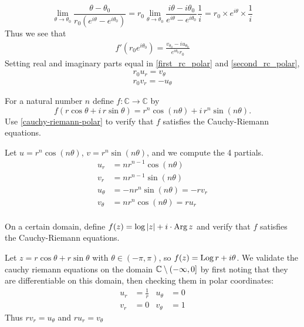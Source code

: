 \documentclass{homework}
\begin{document}
\begin{solution}
     \[\lim_{\theta \to \theta_0} \frac{\theta - \theta_0}{r_0(e^{i\theta} - e^{i\theta_0})} = r_0\lim_{\theta \to \theta_0} \frac{i\theta - i\theta_0}{e^{i\theta} - e^{i\theta_0}}\frac{1}{i} = r_0\times e^{i\theta}\times\frac{1}{i}
     \]
     Thus we see that
     \begin{align}\label{second_rc_polar}
     f'(r_0e^{i\theta_0}) = \frac{v_{\theta_0} - iu_{\theta_0}}{e^{i\theta_0}r_0}
     \end{align}
     Setting real and imaginary parts equal in \ref{first_rc_polar} and \ref{second_rc_polar},
     \begin{align*}
     r_0u_r = v_\theta \\
     r_0v_r = - u_\theta
     \end{align*}
     \end{solution}
     \begin{problem}
       For a natural number $n$ define $f : \mathbb{C} \to \mathbb{C}$ by
         \[
             f(r \cos \theta + i \, r\sin \theta) = r^n \cos \left( n\theta \right) + i \, r^n \sin \left( n\theta \right).
               \]
                 Use \ref{cauchy-riemann-polar} to verify that $f$ satisfies the
                   Cauchy-Riemann equations.
                   \end{problem}
                   \begin{solution}
                   Let $u=r^n\cos(n\theta)$, $v = r^n\sin(n\theta)$, and we compute the 4 partials.
                   \begin{align*}
                   u_r &= nr^{n-1}\cos(n\theta)\\
                   v_r &= nr^{n-1}\sin(n\theta)\\
                   u_\theta &= -nr^{n}\sin(n\theta) = -rv_r\\
                   v_\theta &= nr^{n}\cos(n\theta) = ru_r\\
                   \end{align*}
                   \end{solution}


                   \begin{problem}
                     On a certain domain, define $f(z) = \log \left|z\right| + i \cdot \operatorname{Arg} z$
                       and verify that $f$ satisfies the Cauchy-Riemann equations.
                       \end{problem}
                       \begin{solution}
                       Let $z=r\cos{\theta} + r\sin{\theta}$ with $\theta \in (-\pi, \pi)$, so $f(z) = \operatorname{Log} r + i \theta$. We validate the cauchy riemann equations on the domain $\mathbb{C}\setminus(-\infty, 0]$ by first noting that they are differentiable on this domain, then checking them in polar coordinates:
                       \begin{align*}
                       u_r &= \frac{1}{r} &  u_\theta &= 0\\
                       v_r &= 0 & v_\theta &= 1
                       \end{align*}
                       Thus $rv_r = u_\theta$ and $ru_r = v_\theta$
                       \end{solution}
\end{document}
